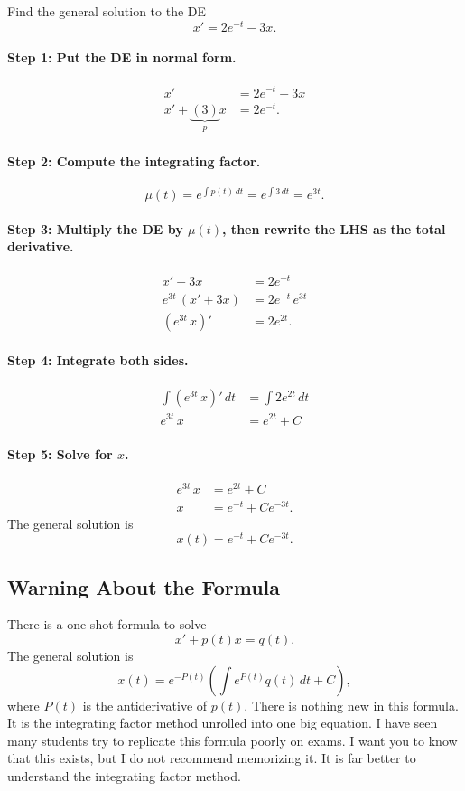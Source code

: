 \documentclass[10pt,letterpaper]{article}
\begin{document}
\begin{example}[3]{
Find the general solution to the DE
\[
x' = 2e^{-t} - 3x.
\]
}
\paragraph{Step 1: Put the DE in normal form.}
\begin{align*}
x' &= 2e^{-t} - 3x\\
x' + \underbrace{(3)}_{p}x &= 2e^{-t}.
\end{align*}
\paragraph{Step 2: Compute the integrating factor.} 
\[
\mu(t)=e^{\int p(t)\,dt}=e^{\int 3\,dt}=e^{3t}.
\]

\paragraph{Step 3: Multiply the DE by $\mu(t)$, then rewrite the LHS as the total derivative.} 
\begin{align*}
    x' + 3x &= 2e^{-t}\\
    e^{3t}\,(x' + 3x) &= 2e^{-t}\,e^{3t}\\
(e^{3t}\,x)' &= 2e^{2t}.
\end{align*}

\paragraph{Step 4: Integrate both sides.}
\begin{align*}
\int (e^{3t}\,x)'\,dt &= \int 2e^{2t}\,dt\\
e^{3t}\,x &= e^{2t}+C
\end{align*}

\paragraph{Step 5: Solve for $x$.}
\begin{align*}    
e^{3t}\,x &= e^{2t}+C\\
x&=e^{-t}+Ce^{-3t}.
\end{align*}
The general solution is 
$$
\boxed{x(t)=e^{-t}+Ce^{-3t}.}
$$
\end{example}

\subsection{Warning About the Formula}
There is a one-shot formula to solve 
$$
    x' + p(t) x=q(t).
$$
The general solution is 
$$
    x(t) = e^{-P(t)}\left( \int e^{P(t)} q(t)\,dt+C\right),
$$
where $P(t)$ is the antiderivative of $p(t)$. There is nothing new in this formula. It is the integrating factor method unrolled into one big equation. I have seen many students try to replicate this formula poorly on exams. I want you to know that this exists, but I do not recommend memorizing it. It is far better to understand the integrating factor method.
\end{document}
